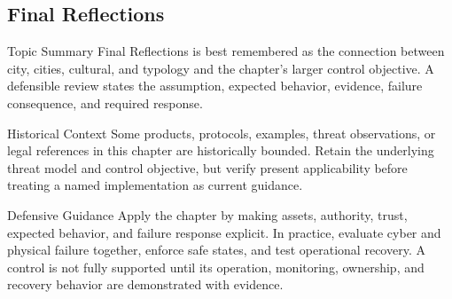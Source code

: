 \documentclass[11pt,letterpaper]{article}
\begin{document}
\subsection*{Final Reflections}
\begin{CornellNotesTable}
\end{CornellNotesTable}
\begin{CornellSummaryBox}{Topic Summary}
Final Reflections is best remembered as the connection between city, cities, cultural, and typology and the chapter's larger control objective. A defensible review states the assumption, expected behavior, evidence, failure consequence, and required response.
\end{CornellSummaryBox}
\begin{CornellWarningBox}{Historical Context}
Some products, protocols, examples, threat observations, or legal references in this chapter are historically bounded. Retain the underlying threat model and control objective, but verify present applicability before treating a named implementation as current guidance.
\end{CornellWarningBox}
\begin{CornellOverviewBox}{Defensive Guidance}
Apply the chapter by making assets, authority, trust, expected behavior, and failure response explicit. In practice, evaluate cyber and physical failure together, enforce safe states, and test operational recovery. A control is not fully supported until its operation, monitoring, ownership, and recovery behavior are demonstrated with evidence.
\end{CornellOverviewBox}
\end{document}
